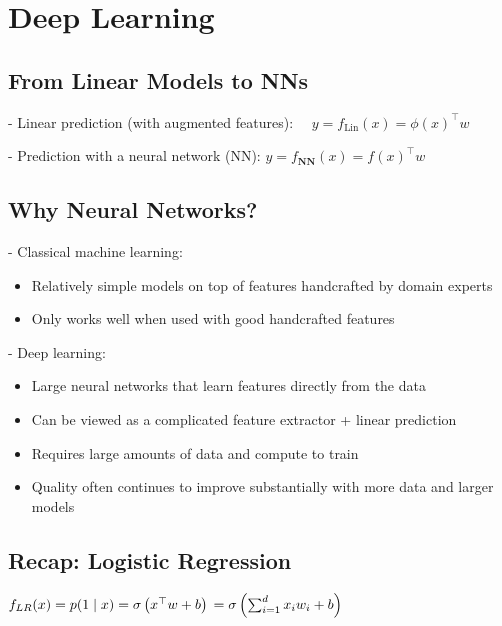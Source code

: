 
\section*{Deep Learning}

\subsection*{From Linear Models to NNs}
- Linear prediction (with augmented features): $\quad y=f_{\operatorname{Lin}}(x)=\phi(x)^{\top} w$

- Prediction with a neural network (NN): $y=f_{\mathbf{NN}}(x)=f(x)^\top w$


\subsection*{Why Neural Networks?}
- Classical machine learning:

\begin{itemize}
  \item Relatively simple models on top of features handcrafted by domain experts

  \item Only works well when used with good handcrafted features

\end{itemize}

- Deep learning:

\begin{itemize}
  \item Large neural networks that learn features directly from the data

  \item Can be viewed as a complicated feature extractor + linear prediction

  \item Requires large amounts of data and compute to train

  \item Quality often continues to improve substantially with more data and larger models

\end{itemize}

\subsection*{Recap: Logistic Regression}

$f_{L R}(x)=p(1 \mid x)=\sigma\left(x^{\top} w+b\right)\\=\sigma\left(\sum_{i=1}^{d} x_{i} w_{i}+b\right)$

